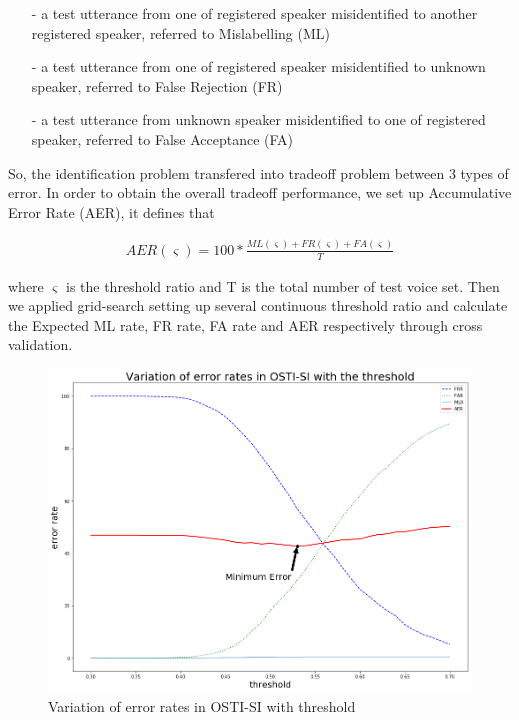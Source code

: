 \documentclass[12pt,DIV14,BCOR12mm,a4paper,footinclude=false,headinclude,parskip=half-,twoside,openright,cleardoublepage=empty,toc=index,bibliography=totoc,listof=totoc]{scrreprt}
\numberwithin{equation}{chapter}
\begin{document}
\begin{itemize}
	\item[-] a test utterance from one of registered speaker misidentified to another registered speaker, referred to Mislabelling (ML)
	\item[-] a test utterance from one of registered speaker misidentified to unknown speaker, referred to False Rejection (FR)
	\item[-] a test utterance from unknown speaker misidentified to one of registered speaker, referred to False Acceptance (FA)
\end{itemize}

So, the identification problem transfered into tradeoff problem between 3 types of error. In order to obtain the overall tradeoff performance, we set up Accumulative Error Rate (AER), it defines that

\begin{align}
AER(\varsigma)=100*\frac{ML(\varsigma)+FR(\varsigma)+FA(\varsigma)}{T}
\end{align}

where $\varsigma$ is the threshold ratio and T is the total number of test voice set. Then we applied grid-search setting up several continuous threshold ratio and calculate the Expected ML rate, FR rate, FA rate and AER respectively through cross validation.

\begin{figure}
	\centering
	\includegraphics[scale=0.5]{image/enhancement}
	\caption{Variation of error rates in OSTI-SI with threshold}
	\label{enhancement}
\end{figure}
\end{document}
